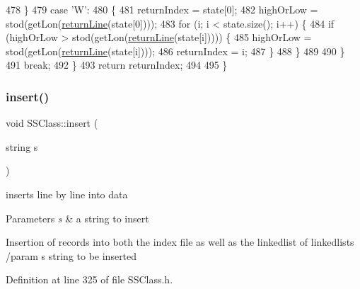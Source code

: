 \begin{DoxyCode}
478     \}
479     \textcolor{keywordflow}{case} \textcolor{charliteral}{'W'}:
480     \{
481         returnIndex = state[0];
482         highOrLow = stod(getLon(\hyperlink{classSSClass_ab0a8ea1af895df28359b5733bd920ef3}{returnLine}(state[0])));
483         \textcolor{keywordflow}{for} (i; i < state.size(); i++) \{
484             \textcolor{keywordflow}{if} (highOrLow > stod(getLon(\hyperlink{classSSClass_ab0a8ea1af895df28359b5733bd920ef3}{returnLine}(state[i])))) \{
485                 highOrLow = stod(getLon(\hyperlink{classSSClass_ab0a8ea1af895df28359b5733bd920ef3}{returnLine}(state[i])));
486                 returnIndex = i;
487             \}
488         \}
489 
490     \}
491     \textcolor{keywordflow}{break};
492     \}
493     \textcolor{keywordflow}{return} returnIndex;
494 
495 \}
\end{DoxyCode}
\mbox{\label{classSSClass_a45c5585c784bf7c4f823f66426664aea}} 
\subsubsection{\texorpdfstring{insert()}{insert()}}
{\footnotesize\ttfamily void S\+S\+Class\+::insert (\begin{DoxyParamCaption}\item[{string}]{s }\end{DoxyParamCaption})}



inserts line by line into data 


\begin{DoxyParams}{Parameters}
{\em s} & a string to insert\\
\hline
\end{DoxyParams}
Insertion of records into both the index file as well as the linkedlist of linkedlists /param s string to be inserted 

Definition at line 325 of file S\+S\+Class.\+h.


